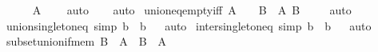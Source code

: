 \begin{isabellebody}
\ \ \ \ \isamarkupfalse%
\ {\isachardoublequoteopen}A\ {\isacharequal}{\kern0pt}\ {\isacharbraceleft}{\kern0pt}{\isacharbraceleft}{\kern0pt}{\isacharbraceright}{\kern0pt}{\isacharbraceright}{\kern0pt}{\isachardoublequoteclose}\ \isamarkupfalse%
\ auto\isanewline
\ \ \isamarkupfalse%
\isanewline
{}\isamarkupfalse%
\ auto%
\endisatagproof
{\isafoldproof}%
%
\isadelimproof
\isanewline
%
\endisadelimproof
\isanewline
{}\isamarkupfalse%
\ union{\isacharunderscore}{\kern0pt}eq{\isacharunderscore}{\kern0pt}empty{\isacharunderscore}{\kern0pt}iff{\isacharprime}{\kern0pt}{\isacharcolon}{\kern0pt}\ {\isachardoublequoteopen}{\isasymUnion}A\ {\isacharequal}{\kern0pt}\ {\isacharbraceleft}{\kern0pt}{\isacharbraceright}{\kern0pt}\ {\isasymlongleftrightarrow}\ {\isacharparenleft}{\kern0pt}{\isasymforall}B\ {\isasymin}\ A{\isachardot}{\kern0pt}\ B\ {\isacharequal}{\kern0pt}\ {\isacharbraceleft}{\kern0pt}{\isacharbraceright}{\kern0pt}{\isacharparenright}{\kern0pt}{\isachardoublequoteclose}%
\isadelimproof
\ %
\endisadelimproof
%
\isatagproof
{}\isamarkupfalse%
\ auto%
\endisatagproof
{\isafoldproof}%
%
\isadelimproof
%
\endisadelimproof
\isanewline
\isanewline
{}\isamarkupfalse%
\ union{\isacharunderscore}{\kern0pt}singleton{\isacharunderscore}{\kern0pt}eq\ {\isacharbrackleft}{\kern0pt}simp{\isacharbrackright}{\kern0pt}{\isacharcolon}{\kern0pt}\ {\isachardoublequoteopen}{\isasymUnion}{\isacharbraceleft}{\kern0pt}b{\isacharbraceright}{\kern0pt}\ {\isacharequal}{\kern0pt}\ b{\isachardoublequoteclose}%
\isadelimproof
\ %
\endisadelimproof
%
\isatagproof
{}\isamarkupfalse%
\ auto%
\endisatagproof
{\isafoldproof}%
%
\isadelimproof
%
\endisadelimproof
\isanewline
\isanewline
{}\isamarkupfalse%
\ inter{\isacharunderscore}{\kern0pt}singleton{\isacharunderscore}{\kern0pt}eq\ {\isacharbrackleft}{\kern0pt}simp{\isacharbrackright}{\kern0pt}{\isacharcolon}{\kern0pt}\ {\isachardoublequoteopen}{\isasymInter}{\isacharbraceleft}{\kern0pt}b{\isacharbraceright}{\kern0pt}\ {\isacharequal}{\kern0pt}\ b{\isachardoublequoteclose}%
\isadelimproof
\ %
\endisadelimproof
%
\isatagproof
{}\isamarkupfalse%
\ auto%
\endisatagproof
{\isafoldproof}%
%
\isadelimproof
%
\endisadelimproof
\isanewline
\isanewline
{}\isamarkupfalse%
\ subset{\isacharunderscore}{\kern0pt}union{\isacharunderscore}{\kern0pt}if{\isacharunderscore}{\kern0pt}mem{\isacharcolon}{\kern0pt}\ {\isachardoublequoteopen}B\ {\isasymin}\ A\ {\isasymLongrightarrow}\ B\ {\isasymsubseteq}\ {\isasymUnion}A{\isachardoublequoteclose}%

\end{isabellebody}
